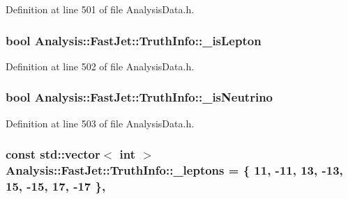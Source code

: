 Definition at line 501 of file Analysis\+Data.\+h.

\subsubsection[{\texorpdfstring{\+\_\+is\+Lepton}{_isLepton}}]{\setlength{\rightskip}{0pt plus 5cm}bool Analysis\+::\+Fast\+Jet\+::\+Truth\+Info\+::\+\_\+is\+Lepton\hspace{0.3cm}{\ttfamily [protected]}}\hypertarget{classAnalysis_1_1FastJet_1_1TruthInfo_afa94b750c98dede7d4fa6a48c459dd5d}{}\label{classAnalysis_1_1FastJet_1_1TruthInfo_afa94b750c98dede7d4fa6a48c459dd5d}


Definition at line 502 of file Analysis\+Data.\+h.

\subsubsection[{\texorpdfstring{\+\_\+is\+Neutrino}{_isNeutrino}}]{\setlength{\rightskip}{0pt plus 5cm}bool Analysis\+::\+Fast\+Jet\+::\+Truth\+Info\+::\+\_\+is\+Neutrino\hspace{0.3cm}{\ttfamily [protected]}}\hypertarget{classAnalysis_1_1FastJet_1_1TruthInfo_a18a62f405e19e57214a4ca36f815a2a0}{}\label{classAnalysis_1_1FastJet_1_1TruthInfo_a18a62f405e19e57214a4ca36f815a2a0}


Definition at line 503 of file Analysis\+Data.\+h.

\subsubsection[{\texorpdfstring{\+\_\+leptons}{_leptons}}]{\setlength{\rightskip}{0pt plus 5cm}const std\+::vector$<$ int $>$ Analysis\+::\+Fast\+Jet\+::\+Truth\+Info\+::\+\_\+leptons = \{ 11, -\/11, 13, -\/13, 15, -\/15, 17, -\/17 \}\hspace{0.3cm}{\ttfamily [static]}, {\ttfamily [private]}}\hypertarget{classAnalysis_1_1FastJet_1_1TruthInfo_a23c0cd8c38cbc6613aafb00170365437}{}\label{classAnalysis_1_1FastJet_1_1TruthInfo_a23c0cd8c38cbc6613aafb00170365437}


